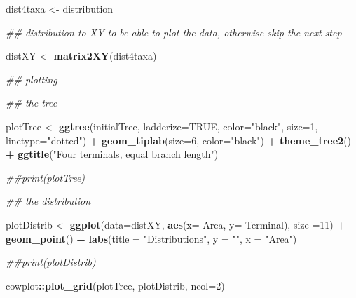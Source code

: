 \documentclass[]{article}
\newenvironment{Shaded}{\begin{snugshade}}{\end{snugshade}}
\newcommand{\CommentTok}[1]{\textcolor[rgb]{0.56,0.35,0.01}{\textit{#1}}}
\newcommand{\DataTypeTok}[1]{\textcolor[rgb]{0.13,0.29,0.53}{#1}}
\newcommand{\DecValTok}[1]{\textcolor[rgb]{0.00,0.00,0.81}{#1}}
\newcommand{\KeywordTok}[1]{\textcolor[rgb]{0.13,0.29,0.53}{\textbf{#1}}}
\newcommand{\NormalTok}[1]{#1}
\newcommand{\OperatorTok}[1]{\textcolor[rgb]{0.81,0.36,0.00}{\textbf{#1}}}
\newcommand{\OtherTok}[1]{\textcolor[rgb]{0.56,0.35,0.01}{#1}}
\newcommand{\StringTok}[1]{\textcolor[rgb]{0.31,0.60,0.02}{#1}}
\begin{document}
\begin{Shaded}
\begin{Highlighting}[]
\NormalTok{dist4taxa <-}\StringTok{ }\NormalTok{distribution}

\CommentTok{## distribution to XY to be able to plot the data, otherwise skip the next step}

\NormalTok{distXY <-}\StringTok{ }\KeywordTok{matrix2XY}\NormalTok{(dist4taxa)}


\CommentTok{## plotting}

\CommentTok{## the tree}

\NormalTok{plotTree <-}\StringTok{  }\KeywordTok{ggtree}\NormalTok{(initialTree, }\DataTypeTok{ladderize=}\OtherTok{TRUE}\NormalTok{,}
                    \DataTypeTok{color=}\StringTok{"black"}\NormalTok{, }\DataTypeTok{size=}\DecValTok{1}\NormalTok{, }\DataTypeTok{linetype=}\StringTok{"dotted"}\NormalTok{) }\OperatorTok{+}
\StringTok{             }\KeywordTok{geom_tiplab}\NormalTok{(}\DataTypeTok{size=}\DecValTok{6}\NormalTok{, }\DataTypeTok{color=}\StringTok{"black"}\NormalTok{) }\OperatorTok{+}
\StringTok{             }\KeywordTok{theme_tree2}\NormalTok{() }\OperatorTok{+}
\StringTok{             }\KeywordTok{ggtitle}\NormalTok{(}\StringTok{"Four terminals, equal branch length"}\NormalTok{)}


\CommentTok{##print(plotTree)}



\CommentTok{## the distribution}

\NormalTok{plotDistrib <-}\StringTok{ }\KeywordTok{ggplot}\NormalTok{(}\DataTypeTok{data=}\NormalTok{distXY,}
                      \KeywordTok{aes}\NormalTok{(}\DataTypeTok{x=}\NormalTok{ Area, }\DataTypeTok{y=}\NormalTok{ Terminal),}
                      \DataTypeTok{size =}\DecValTok{11}\NormalTok{) }\OperatorTok{+}
\StringTok{               }\KeywordTok{geom_point}\NormalTok{() }\OperatorTok{+}
\StringTok{               }\KeywordTok{labs}\NormalTok{(}\DataTypeTok{title =} \StringTok{"Distributions"}\NormalTok{,}
                    \DataTypeTok{y =} \StringTok{""}\NormalTok{,}
                    \DataTypeTok{x =} \StringTok{"Area"}\NormalTok{)}

\CommentTok{##print(plotDistrib)}

\NormalTok{cowplot}\OperatorTok{::}\KeywordTok{plot_grid}\NormalTok{(plotTree, plotDistrib, }\DataTypeTok{ncol=}\DecValTok{2}\NormalTok{)}
\end{Highlighting}
\end{Shaded}
\end{document}
